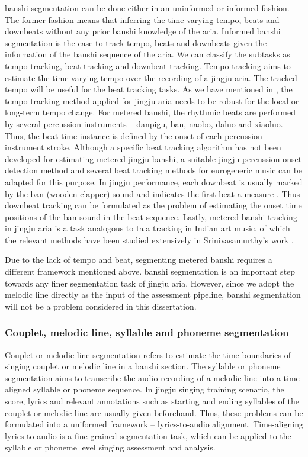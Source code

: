\Gls{banshi} segmentation can be done either in an uninformed or informed fashion. The former fashion means that inferring the time-varying tempo, beats and downbeats without any prior \gls{banshi} knowledge of the aria. Informed \gls{banshi} segmentation is the case to track tempo, beats and downbeats given the information of the \gls{banshi} sequence of the aria. We can classify the subtasks as tempo tracking, beat tracking and downbeat tracking. Tempo tracking aims to estimate the time-varying tempo over the recording of a jingju aria. The tracked tempo will be useful for the beat tracking tasks. As we have mentioned in , the tempo tracking method applied for jingju aria needs to be robust for the local or long-term tempo change. For metered \gls{banshi}, the rhythmic beats are performed by several percussion instruments -- danpigu, ban, naobo, daluo and xiaoluo. Thus, the beat time instance is defined by the onset of each percussion instrument stroke. Although a specific beat tracking algorithm has not been developed for estimating metered jingju \gls{banshi}, a suitable jingju percussion onset detection method \cite{Tian2014} and several beat tracking methods \cite{Bock2011, Krebs, Bock} for eurogeneric music can be adapted for this purpose. In jingju performance, each downbeat is usually marked by the ban (wooden clapper) sound and indicates the first beat a measure \cite{Wichmann1991a}. Thus downbeat tracking can be formulated as the problem of estimating the onset time positions of the ban sound in the beat sequence. Lastly, metered \gls{banshi} tracking in jingju aria is a task analogous to tala tracking in Indian art music, of which the relevant methods have been studied extensively in Srinivasamurthy's work \cite{Srinivasamurthy2016}.

Due to the lack of tempo and beat, segmenting metered \gls{banshi} requires a different framework mentioned above. \Gls{banshi} segmentation is an important step towards any finer segmentation task of jingju aria. However, since we adopt the melodic line directly as the input of the assessment pipeline, \gls{banshi} segmentation will not be a problem considered in this dissertation.

\subsubsection{Couplet, melodic line, syllable and phoneme segmentation}

Couplet or melodic line segmentation refers to estimate the time boundaries of singing couplet or melodic line in a \gls{banshi} section. The syllable or phoneme segmentation aims to transcribe the audio recording of a melodic line into a time-aligned syllable or phoneme sequence. In jingju singing training scenario, the score, lyrics and relevant annotations such as starting and ending syllables of the couplet or melodic line are usually given beforehand. Thus, these problems can be formulated into a uniformed framework -- lyrics-to-audio alignment. Time-aligning lyrics to audio is a fine-grained segmentation task, which can be applied to the syllable or phoneme level singing assessment and analysis.

